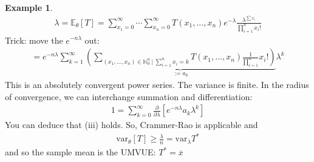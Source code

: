 \documentclass[11pt]{scrartcl}
\theoremstyle{definition}
\newtheorem{ex}{Example}
\theoremstyle{remark}
\newcommand{\EXth}[1]{\mathbb{E}_\theta \left[ #1 \right]}
\begin{document}
{\begin{ex}
	\begin{align*}
		\lambda = \EXth{T} = \sum_{x_1 = 0 }^\infty \cdots \sum_{x_n = 0}^\infty T(x_1, ..., x_n) e^{-\lambda}	\frac{\lambda^{\sum x_i}}{\prod_{i=1}^n x_i !} 
	\end{align*}
	Trick: move the $e^{-n \lambda}$ out: 
	\begin{align*}
		= e^{- n \lambda} \sum_{k=1}^\infty \underbrace{ \left( 	\sum_{(x_1, ..., x_n) \in \mathbb{N}_0^n\ |\ \sum_{i=1}^n x_i = k } T(x_1, ..., x_n) \frac{1}{\prod_{i=1}^n} x_i!	\right) }_{:= a_k}	\lambda^k
	\end{align*}
	This is an absolutely convergent power series. The variance is finite. In the radius of convergence, we can interchange summation and differentiation: 
	\begin{align*}
		1 = \sum_{k=0}^\infty \frac{\partial }{\partial \lambda}	 \left[ e^{-n \lambda} a_k \lambda^k \right] 
	\end{align*}
	You can deduce that (iii) holds. So, Crammer-Rao is applicable and 
	\begin{align*}
		\text{var}_\theta [T] \geq \frac{\lambda}{n} = \text{var}_\lambda T^*	
	\end{align*}
	and so the sample mean is the UMVUE: $T^* = \overline{x}$ 
\end{ex}

}
\end{document}

